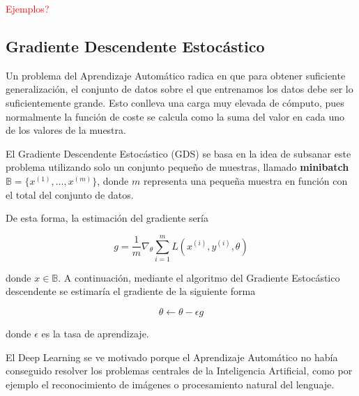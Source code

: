 	\textcolor{red}{Ejemplos?}

	\subsection{Gradiente Descendente Estocástico}
	
	Un problema del Aprendizaje Automático radica en que para obtener suficiente generalización, el conjunto de datos sobre el que entrenamos los datos debe ser lo suficientemente grande. Esto conlleva una carga muy elevada de cómputo, pues normalmente la función de coste se calcula como la suma del valor en cada uno de los valores de la muestra.
	
	El Gradiente Descendente Estocástico (GDS) se basa en la idea de subsanar este problema utilizando solo un conjunto pequeño de muestras, llamado \textbf{minibatch} $\mathbb{B} = \{x^{(1)}, ..., x^{(m)}\}$, donde $m$ representa una pequeña muestra en función con el total del conjunto de datos.
	
	De esta forma, la estimación del gradiente sería
	
	$$ 
		g = \frac{1}{m} \nabla_{\theta} \sum_{i = 1}^{m} L(x^{(i)}, y^{(i)}, \theta)
	$$
	
	donde $x \in \mathbb{B}$. A continuación, mediante el algoritmo del Gradiente Estocástico descendente se estimaría el gradiente de la siguiente forma
	
	$$ 
		\theta \leftarrow \theta - \epsilon g
	$$
	
	donde $\epsilon$ es la tasa de aprendizaje.
	
	
	El Deep Learning se ve motivado porque el Aprendizaje Automático no había conseguido resolver los problemas centrales de la Inteligencia Artificial, como por ejemplo el reconocimiento de imágenes o procesamiento natural del lenguaje.
	



